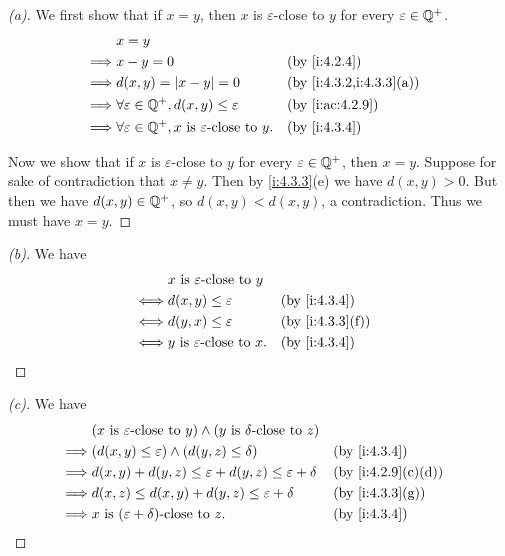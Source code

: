 \begin{proof}[(a)]
  We first show that if \(x = y\), then \(x\) is \(\varepsilon\)-close to \(y\) for every \(\varepsilon \in \mathbb{Q}^+\).
  \begin{align*}
             & x = y                                                                                                \\
    \implies & x - y = 0                                                               &  & \by{i:4.2.4}            \\
    \implies & d(x, y) = \abs{x - y} = 0                                               &  & \by{i:4.3.2,i:4.3.3}[a] \\
    \implies & \forall \varepsilon \in \Q^+, d(x, y) \leq \varepsilon                  &  & \by{i:ac:4.2.9}         \\
    \implies & \forall \varepsilon \in \Q^+, x \text{ is \(\varepsilon\)-close to } y. &  & \by{i:4.3.4}
  \end{align*}

  Now we show that if \(x\) is \(\varepsilon\)-close to \(y\) for every \(\varepsilon \in \mathbb{Q}^+\), then \(x = y\).
  Suppose for sake of contradiction that \(x \neq y\).
  Then by \cref{i:4.3.3}(e) we have \(d(x, y) > 0\).
  But then we have \(d(x, y) \in \mathbb{Q}^+\), so \(d(x, y) < d(x, y)\), a contradiction.
  Thus we must have \(x = y\).
\end{proof}

\begin{proof}[(b)]
  We have
  \begin{align*}
         & x \text{ is \(\varepsilon\)-close to } y                       \\
    \iff & d(x, y) \leq \varepsilon                  &  & \by{i:4.3.4}    \\
    \iff & d(y, x) \leq \varepsilon                  &  & \by{i:4.3.3}[f] \\
    \iff & y \text{ is \(\varepsilon\)-close to } x. &  & \by{i:4.3.4}
  \end{align*}
\end{proof}

\begin{proof}[(c)]
  We have
  \begin{align*}
             & (x \text{ is \(\varepsilon\)-close to } y) \land (y \text{ is \(\delta\)-close to } z)                        \\
    \implies & \pa{d(x, y) \leq \varepsilon} \land \pa{d(y, z) \leq \delta}                           &  & \by{i:4.3.4}      \\
    \implies & d(x, y) + d(y, z) \leq \varepsilon + d(y, z) \leq \varepsilon + \delta                 &  & \by{i:4.2.9}[c,d] \\
    \implies & d(x, z) \leq d(x, y) + d(y, z) \leq \varepsilon + \delta                               &  & \by{i:4.3.3}[g]   \\
    \implies & x \text{ is \((\varepsilon + \delta)\)-close to } z.                                   &  & \by{i:4.3.4}
  \end{align*}
\end{proof}


